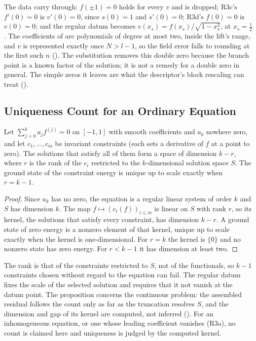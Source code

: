 The data carry through: $f(\pm1)=0$ holds for every $v$ and is dropped; R3c's $f'(0)=0$ is $v'(0)=0$, since $s(0)=1$ and $s'(0)=0$; R3d's $f(0)=0$ is $v(0)=0$; and the regular datum becomes $v(x_s)=f(x_s)/\sqrt{1-x_s^2}$, at $x_s=\tfrac12$. The coefficients of  are polynomials of degree at most two, inside the lift's range, and $v$ is represented exactly once $N>l-1$, so the field error falls to rounding at the first such $n$ (). The substitution removes this double zero because the branch point is a known factor of the solution; it is not a remedy for a double zero in general. The simple zeros it leaves are what the descriptor's block rescaling can treat ().

\subsection{Uniqueness Count for an Ordinary Equation}
\label{app:uniqueness-count}
\begin{proposition}
    \label{prop:uniqueness-count}
    Let $\sum_{j=0}^{k}a_j f^{(j)}=0$ on $[-1,1]$ with smooth coefficients and $a_k$ nowhere zero, and let $c_1,\dots,c_m$ be invariant constraints (each sets a derivative of $f$ at a point to zero). The solutions that satisfy all of them form a space of dimension $k-r$, where $r$ is the rank of the $c_i$ restricted to the $k$-dimensional solution space $S$. The ground state of the constraint energy is unique up to scale exactly when $r=k-1$.
\end{proposition}
\begin{proof}
    Since $a_k$ has no zero, the equation is a regular linear system of order $k$ and $S$ has dimension $k$. The map $f\mapsto(c_i(f))_{i\le m}$ is linear on $S$ with rank $r$, so its kernel, the solutions that satisfy every constraint, has dimension $k-r$. A ground state of zero energy is a nonzero element of that kernel, unique up to scale exactly when the kernel is one-dimensional. For $r=k$ the kernel is $\{0\}$ and no nonzero state has zero energy. For $r<k-1$ it has dimension at least two.
\end{proof}
The rank is that of the constraints restricted to $S$, not of the functionals, so $k-1$ constraints chosen without regard to the equation can fail. The regular datum fixes the scale of the selected solution and requires that it not vanish at the datum point. The proposition concerns the continuous problem: the assembled residual follows the count only as far as the truncation resolves $S$, and the dimension and gap of its kernel are computed, not inferred (). For an inhomogeneous equation, or one whose leading coefficient vanishes (R3a), no count is claimed here and uniqueness is judged by the computed kernel.

